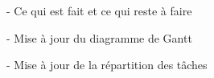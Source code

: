 
- Ce qui est fait et ce qui reste à faire

- Mise à jour du diagramme de Gantt

- Mise à jour de la répartition des tâches